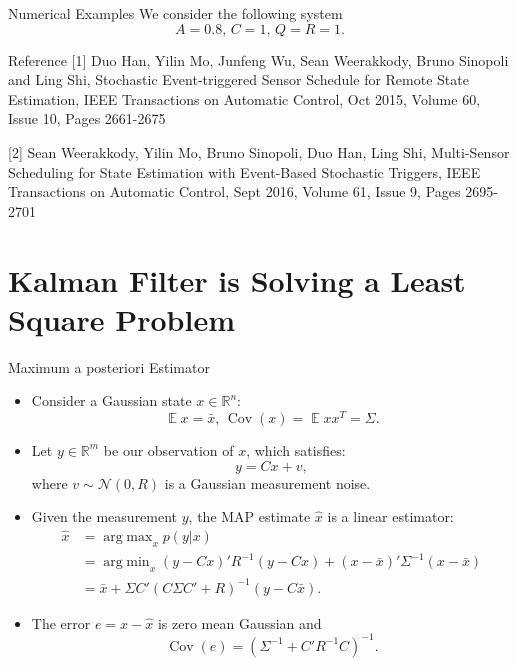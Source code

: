 \documentclass[10pt]{beamer}
\newlength\figureheight
\newlength\figurewidth
\newcommand{\tikzdir}[1]{#1.tikz}
\newcommand{\inputtikz}[1]{}}
\DeclareMathOperator{\1}{\textbf{1}}
\DeclareMathOperator{\Cov}{Cov}
\DeclareMathOperator{\argmin}{arg\;min}
\DeclareMathOperator{\argmax}{arg\;max}
\DeclareMathOperator{\E}{\mathbb E}
\begin{document}
\begin{frame}{Numerical Examples}
  We consider the following system
  \begin{displaymath}
    A = 0.8,\,C = 1,\, Q = R = 1. 
  \end{displaymath}
  \setlength\figureheight{5cm}
  \setlength\figurewidth{8cm}
  \begin{center}
    \inputtikz{eventbased}
  \end{center}
\end{frame}


\begin{frame}{Reference}
  [1] Duo Han, Yilin Mo, Junfeng Wu, Sean Weerakkody, Bruno Sinopoli and Ling Shi, Stochastic Event-triggered Sensor Schedule for Remote State Estimation, IEEE Transactions on Automatic Control, Oct 2015, Volume 60, Issue 10, Pages 2661-2675

  [2] Sean Weerakkody, Yilin Mo, Bruno Sinopoli, Duo Han, Ling Shi, Multi-Sensor Scheduling for State Estimation with Event-Based Stochastic Triggers, IEEE Transactions on Automatic Control, Sept 2016, Volume 61, Issue 9, Pages 2695-2701

\end{frame}


\section{Kalman Filter is Solving a Least Square Problem}

\begin{frame}{Maximum a posteriori Estimator}
  \begin{itemize}
    \item Consider a Gaussian state $x\in \mathbb R^n$:
      \begin{displaymath}
	\E x = \bar x,\,\Cov(x) = \E xx^T = \Sigma.
      \end{displaymath}
    \item Let $y\in\mathbb R^m$ be our observation of $x$, which satisfies:
      \begin{displaymath}
	y = C x + v,
      \end{displaymath}
      where $v\sim \mathcal N(0,R)$ is a Gaussian measurement noise. 
    \item Given the measurement $y$, the MAP estimate $\hat x$ is a linear estimator:
      \begin{align*}
	\hat x &= \argmax_x {p(y|x)}\\
	       &= \argmin_x (y-Cx)'R^{-1}(y-Cx) + (x-\bar x)'\Sigma^{-1} (x-\bar x)\\
	&= \bar x + \Sigma C'(C\Sigma C'+R)^{-1}(y-C\bar x).
      \end{align*}
    \item The error $e = x - \hat x$ is zero mean Gaussian and
      \begin{displaymath}
	\Cov(e) = (\Sigma^{-1} +  C'  R^{-1}C)^{-1}.
      \end{displaymath}
  \end{itemize}
\end{frame}
\end{document}
